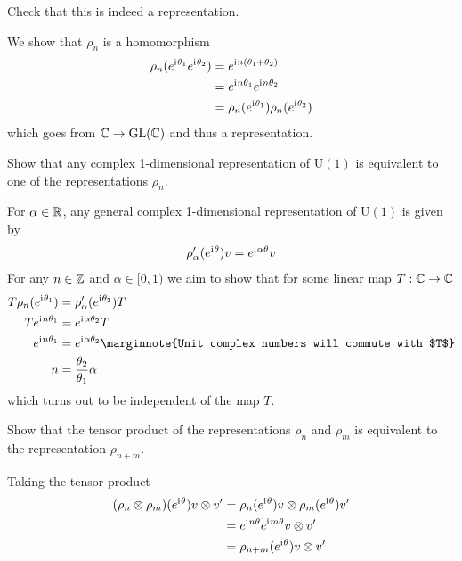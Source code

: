 \documentclass[10pt]{article}
\begin{document}
\begin{example}
	Check that this is indeed a representation.
\end{example}
\sol We show that $\rho_n$ is a homomorphism
$$
\begin{aligned}
	\rho_n(e^{\mathrm{i}\mkern1mu\theta_1}e^{\mathrm{i}\mkern1mu\theta_2}) &= e^{\mathrm{i}\mkern1mu n(\theta_1+\theta_2)}\\
	&= e^{\mathrm{i}\mkern1mu n\theta_1}e^{\mathrm{i}\mkern1mu n\theta_2}\\
	&= \rho_n(e^{\mathrm{i}\mkern1mu\theta_1})\rho_n(e^{\mathrm{i}\mkern1mu\theta_2})
\end{aligned}
$$
which goes from $\mathbb{C} \to \text{GL}(\mathbb{C})$ and thus a representation.


\begin{example}
	Show that any complex 1-dimensional representation of U$(1)$ is equivalent to one of the representations $\rho_n$.
\end{example}
\sol For $\alpha \in \mathbb{R}$, any general complex 1-dimensional representation of U$(1)$ is given by
$$
\rho^\prime_\alpha(e^{\mathrm{i}\mkern1mu \theta})v = e^{\mathrm{i}\mkern1mu \alpha\theta}v
$$
For any $n \in \mathbb{Z}$ and $\alpha \in [0,1)$ we aim to show that for some linear map $T:\mathbb{C}\to\mathbb{C}$
$$
\begin{aligned}
	T\rho_n(e^{\di \theta_1})&=\rho^\prime_\alpha(e^{\di \theta_2})T\\
	Te^{\di n\theta_1} &=e^{\di \alpha\theta_2}T\\
	e^{\di n\theta_1} &=e^{\di \alpha\theta_2}\marginnote{Unit complex numbers will commute with $T$}\\
	n &= \frac{\theta_2}{\theta_1}\alpha
\end{aligned}
$$ 
which turns out to be independent of the map $T$.

\begin{example}
	Show that the tensor product of the representations $\rho_n$ and $\rho_m$ is equivalent to the representation $\rho_{n+m}$.
\end{example}
\sol Taking the tensor product
$$
\begin{aligned}
	(\rho_n \otimes \rho_m)(e^{\mathrm{i}\mkern1mu\theta})v \otimes v^\prime &= \rho_n(e^{\mathrm{i}\mkern1mu\theta})v \otimes \rho_m(e^{\mathrm{i}\mkern1mu\theta})v^\prime\\
	&= e^{\mathrm{i}\mkern1mu n\theta}e^{\mathrm{i}\mkern1mu m\theta} v \otimes v^\prime\\
	&= \rho_{n+m} (e^{\mathrm{i}\mkern1mu\theta})v \otimes v^\prime\\
\end{aligned}
$$
\end{document}
